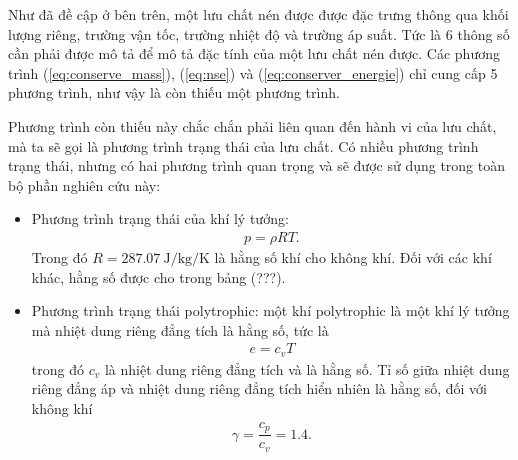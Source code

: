 \documentclass[../../../main.tex]{subfiles}
\begin{document}
    Như đã đề cập ở bên trên, một lưu chất nén được được đặc trưng thông qua khối lượng riêng, trường vận tốc, trường nhiệt độ và trường áp suất. Tức là 6 thông số cần phải được mô tả để mô tả đặc tính của một lưu chất nén được. Các phương trình (\ref{eq:conserve_mass}), (\ref{eq:nse}) và (\ref{eq:conserver_energie}) chỉ cung cấp 5 phương trình, như vậy là còn thiếu một phương trình.

    Phương trình còn thiếu này chắc chắn phải liên quan đến hành vi của lưu chất, mà ta sẽ gọi là phương trình trạng thái của lưu chất. Có nhiều phương trình trạng thái, nhưng có hai phương trình quan trọng và sẽ được sử dụng trong toàn bộ phần nghiên cứu này:
        \begin{itemize}
            \item Phương trình trạng thái của khí lý tưởng:
                \begin{align}
                    p = \rho RT.
                \end{align}
            Trong đó $R=\SI{287.07}{\joule\per\kilogram\per\kelvin}$ là hằng số khí cho không khí. Đối với các khí khác, hằng số được cho trong bảng (???).
            \item Phương trình trạng thái polytrophic: một khí polytrophic là một khí lý tưởng mà nhiệt dung riêng đẳng tích là hằng số, tức là
                \begin{align}
                    e = c_vT
                \end{align}
            trong đó $c_v$ là nhiệt dung riêng đẳng tích và là hằng số. Tỉ số giữa nhiệt dung riêng đẳng áp và nhiệt dung riêng đẳng tích hiển nhiên là hằng số, đối với không khí
                \begin{align}
                    \gamma = \dfrac{c_p}{c_v}=1.4.
                \end{align}
        \end{itemize}
\end{document}
